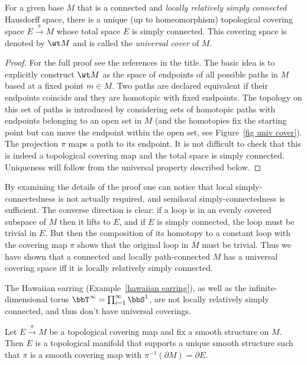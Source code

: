 \begin{thm}
    For a given base $M$ that is a connected and \emph{locally relatively simply connected} Hausdorff space, there is a unique (up to homeomorphism) topological covering space $E\overset{\pi}{\to}M$ whose total space $E$ is simply connected. This covering space is denoted by $\wt M$ and is called the \emph{universal cover} of $M$.
\end{thm}
\begin{proof}
    For the full proof see the references in the title. The basic idea is to explicitly construct $\wt M$ as the space of endpoints of all possible paths in $M$ based at a fixed point $m\in M$. Two paths are declared equivalent if their endpoints coincide and they are homotopic with fixed endpoints. The topology on this set of paths is introduced by considering sets of homotopic paths with endpoints belonging to an open set in $M$ (and the homotopies fix the starting point but can move the endpoint within the open set, see Figure~\ref{fig univ cover}). The projection $\pi$ maps a path to its endpoint. It is not difficult to check that this is indeed a topological covering map and the total space is simply connected. Uniqueness will follow from the universal property described below.
\end{proof}
\begin{rem}
    By examining the details of the proof one can notice that local simply-connectedness is not actually required, and semilocal simply-connectedness is sufficient. The converse direction is clear: if a loop is in an evenly covered subspace of $M$ then it lifts to $E$, and if $E$ is simply connected, the loop must be trivial in $E$. But then the composition of its homotopy to a constant loop with the covering map $\pi$ shows that the original loop in $M$ must be trivial. Thus we have shown that a connected and locally path-connected $M$ has a universal covering space iff it is locally relatively simply connected.
\end{rem}
\begin{example}
    The Hawaiian earring (Example~\ref{hawaiian earring}), as well as the infinite-dimensional torus $\bbT^\infty=\prod_{i=1}^\infty \bbS^1$, are not locally relatively simply connected, and thus don't have universal coverings.
\end{example}

\begin{thm}
Let $E\overset{\pi}{\to}M$ be a topological covering map and fix a smooth structure on $M$. Then $E$ is a topological manifold that supports a unique smooth structure such that $\pi$ is a smooth covering map with $\pi^{-1}(\partial M)=\partial E$.
\end{thm}

